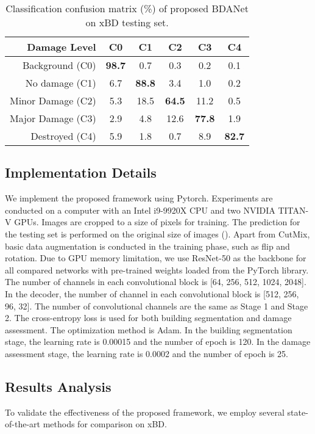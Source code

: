 \documentclass[journal]{IEEEtran}
\begin{document}
\begin{table}[t]
	\centering
	\caption{Classification confusion matrix (\%)  of proposed BDANet on xBD testing set.}
	\begin{tabular}{rccccc}
	\hline
	\hline
	  Damage Level  & C0 & C1 & C2  & C3 & C4 \\
    \hline
    Background (C0) &\textbf{98.7} 	&0.7 &0.3 &	0.2 &	0.1  \\
    No damage (C1) & 6.7 	&\textbf{88.8} &3.4 & 1.0 &	0.2 \\
    Minor Damage (C2) & 5.3 &18.5 &\textbf{64.5} &11.2 &0.5\\
    Major Damage (C3)&  2.9 &	4.8 &	12.6 &	\textbf{77.8} &	1.9\\
    Destroyed (C4) &5.9 &	1.8 &	0.7 &	8.9 &	\textbf{82.7} \\
\hline
\hline
	\end{tabular}
\label{tabConfusion}
\end{table}

\subsection{Implementation Details}
We implement the proposed framework using Pytorch. Experiments are conducted on a computer with an Intel i9-9920X CPU and two NVIDIA TITAN-V GPUs. Images are cropped to a size of  pixels for training. The prediction for the testing set is performed on the original size of images (). Apart from CutMix, basic data augmentation is conducted in the training phase, such as flip and rotation. Due to GPU memory limitation, we use ResNet-50 as the backbone for all compared networks with pre-trained weights loaded from the PyTorch library. The number of channels in each convolutional block is [64, 256, 512, 1024, 2048]. In the decoder, the number of channel in each convolutional block is [512, 256, 96, 32]. The number of convolutional channels are the same as  Stage 1 and Stage 2. The cross-entropy loss is used for both building segmentation and damage assessment. The optimization method is Adam. In the building segmentation stage, the learning rate is 0.00015 and the number of epoch is 120. In the damage assessment stage, the learning rate is 0.0002 and the number of epoch is 25.



\subsection{Results Analysis}
To validate the effectiveness of the proposed framework, we employ several state-of-the-art methods for comparison on xBD. 
\end{document}
